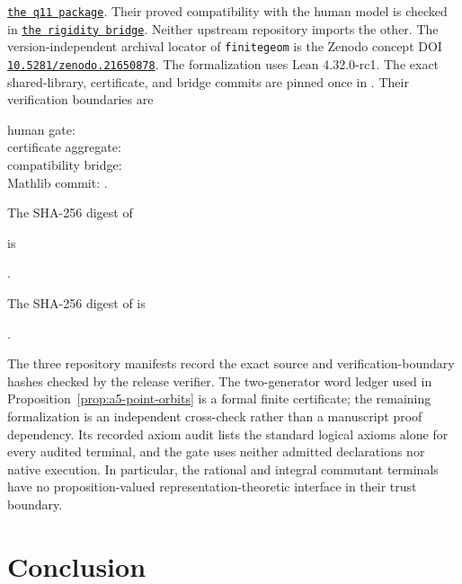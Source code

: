 \documentclass[11pt]{article}
\theoremstyle{definition}
\theoremstyle{remark}
\begin{document}
\href{https://github.com/tavisrudd/finitegeom-clebsch-q11-certificates}
{\texttt{the q11 package}}.  Their proved compatibility with the human model is
checked in
\href{https://github.com/tavisrudd/finitegeom-clebsch-rigidity-bridge}
{\texttt{the rigidity bridge}}.  Neither upstream repository imports the other.  The
version-independent archival locator of \texttt{finitegeom} is the Zenodo concept
DOI \href{https://doi.org/10.5281/zenodo.21650878}
{\texttt{10.5281/zenodo.21650878}}. The formalization uses Lean 4.32.0-rc1.
The exact shared-library, certificate, and bridge commits are pinned once in
.  Their verification boundaries are
\begin{center}
\small
human gate:
\\
certificate aggregate:
\\
compatibility bridge:
\\
Mathlib commit:
.
\end{center}
The SHA-256 digest of
\begin{center}
\small{}
\end{center}
is
\begin{center}
\small{}.
\end{center}
The SHA-256 digest of  is
\begin{center}
\small{}.
\end{center}
The three repository manifests record the exact source and verification-boundary
hashes checked by the release verifier.
The two-generator word ledger used in Proposition~\ref{prop:a5-point-orbits}
is a formal finite certificate; the remaining formalization is an independent
cross-check rather than a manuscript proof dependency.  Its
recorded axiom audit lists the standard logical axioms alone for every audited
terminal, and the gate uses neither admitted declarations nor native
execution.  In particular, the rational and integral commutant terminals have
no proposition-valued representation-theoretic interface in their trust
boundary.

\section{Conclusion}
\end{document}
